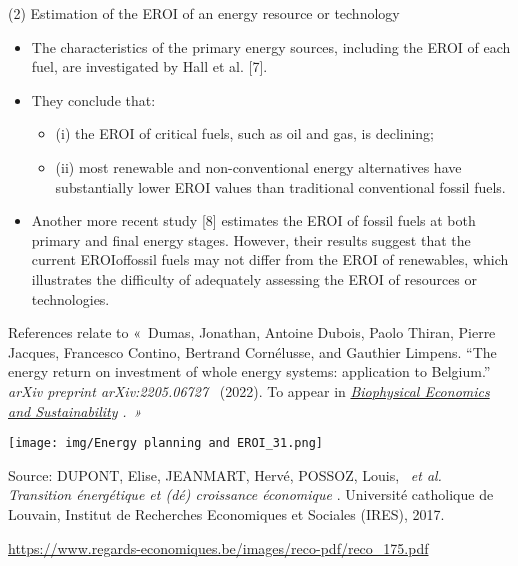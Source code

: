 \begin{frame}{(2) Estimation of the EROI of an energy resource or
technology}
\label{estimation-of-the-eroi-of-an-energy-resource-or-technology}
\begin{itemize}
\tightlist
\item
  The characteristics of the primary energy sources, including the EROI
  of each fuel, are investigated by Hall et al. {[}7{]}.
\item
  They conclude that:

  \begin{itemize}
  \tightlist
  \item
    (i) the EROI of critical fuels, such as oil and gas, is declining;
  \item
    (ii) most renewable and non-conventional energy alternatives have
    substantially lower EROI values than traditional conventional fossil
    fuels.
  \end{itemize}
\item
  Another more recent study {[}8{]} estimates the EROI of fossil fuels
  at both primary and final energy stages. However, their results
  suggest that the current EROIoffossil fuels may not differ from the
  EROI of renewables, which illustrates the difficulty of adequately
  assessing the EROI of resources or technologies.
\end{itemize}

{References relate to «~Dumas, Jonathan, Antoine Dubois, Paolo Thiran,
Pierre Jacques, Francesco Contino, Bertrand Cornélusse, and Gauthier
Limpens. ``The energy return on investment of whole energy systems:
application to Belgium.''~} { \emph{arXiv preprint arXiv:2205.06727} }
{~(2022). To appear in } {
\emph{\href{https://www.springer.com/journal/41247/}{Biophysical
Economics and Sustainability}} } { \emph{.~»} }

\texttt{[image: img/Energy planning and EROI\_31.png]}

Source: {DUPONT, Elise, JEANMART, Hervé, POSSOZ, Louis,~} { \emph{et
al.} } {~} { \emph{Transition énergétique et (dé) croissance économique}
} {. Université catholique de Louvain, Institut de Recherches
Economiques et Sociales (IRES), 2017.}

\url{https://www.regards-economiques.be/images/reco-pdf/reco_175.pdf}
\end{frame}

